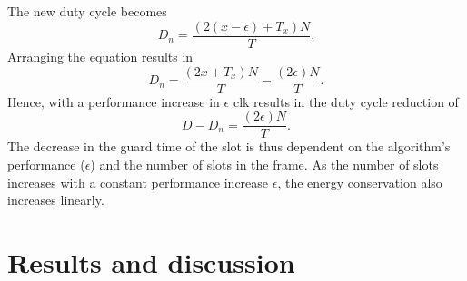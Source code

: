 \documentclass[a4paper,10pt]{report}
\begin{document}
\paragraph*{} The new duty cycle becomes
\begin{equation}
D_n=\dfrac{(2(x-\epsilon)+T_x)N}{T}.
\end{equation}
Arranging the equation results in
\begin{equation}
D_n= \dfrac{(2x+T_x)N}{T} - \dfrac{(2\epsilon)N}{T}.
\end{equation}
Hence, with a performance increase in $\epsilon$ clk results in the duty cycle reduction of
\begin{equation}
D - D_n = \dfrac{(2\epsilon)N}{T}.
\end{equation}
The decrease in the guard time of the slot is thus dependent on the
algorithm's performance ($\epsilon$) and the number of slots in the
frame. As the number of slots increases with a constant performance
increase $\epsilon$, the energy conservation also increases
linearly.
\chapter{\textbf{Results and discussion}}
\end{document}
